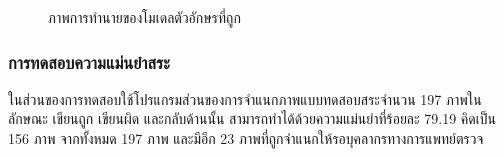 \documentclass[12pt,oneside,openright,a4paper]{cpe-thai-project}
\begin{document}
   \begin{figure}[!h]\centering
    \setlength{\fboxrule}{0.2mm} %
    \setlength{\fboxsep}{1cm}
    \caption{ภาพการทำนายของโมเดลตัวอักษรที่ถูก}\label{fig:system}                  
   \end{figure}
   \newpage
   \subsubsection{การทดสอบความแม่นยำสระ}
   ในส่วนของการทดสอบใช้โปรแกรมส่วนของการจำแนกภาพแบบทดสอบสระจำนวน 197 ภาพในลักษณะ เขียนถูก เขียนผิด  และกลับด้านนั้น สามารถทำได้ด้วยความแม่นยำที่ร้อยละ 79.19 คิดเป็น 156 ภาพ จากทั้งหมด 197 ภาพ และมีอีก 23 ภาพที่ถูกจำแนกให้รอบุคลากรทางการแพทย์ตรวจ
  
\end{document}
